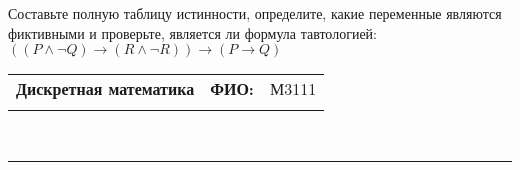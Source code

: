 \documentclass[10pt]{exam}
\newcommand{\class}{Дискретная математика}
\newcommand{\examdate}{}
\begin{document}
\begin{questions}
\begin{enumerate}[a)]
\end{enumerate}\question Составьте полную таблицу истинности, определите, какие переменные являются фиктивными и проверьте, является ли формула тавтологией:
$(( P \land \neg Q) \rightarrow (R \land \neg R)) \rightarrow (P \rightarrow Q)$

\end{questions}
\newpage
\begin{flushright}
\begin{tabular}{p{2.8in} r l}
\textbf{\class} & \textbf{ФИО:} &М3111
\\

\textbf{\examdate} &&\\
\end{tabular}\\
\end{flushright}
\rule[1ex]{\textwidth}{.1pt}
\end{document}
